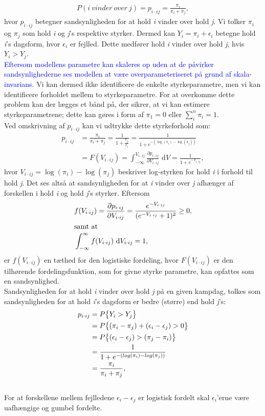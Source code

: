 \documentclass[11pt,a4paper]{article}
\begin{document}
\begin{align*}
    P(i\ vinder\ over\ j) = p_{i\cdot ij} = \frac{\pi_i}{\pi_i+\pi_j},
\end{align*}
hvor $p_{i\cdot ij}$ betegner sandsynligheden for at hold \textit{i} vinder over hold \textit{j}. Vi tolker $\pi_i$ og $\pi_j$ som hold \textit{i} og \textit{j}'s respektive styrker. Dermed kan $Y_i=\pi_i+\epsilon_i$ betegne hold \textit{i}'s dagsform, hvor $\epsilon_i$ er fejlled. Dette medfører hold \textit{i} vinder over hold \textit{j}, hvis $Y_i>Y_j$.\\ \textcolor{blue}{Eftersom modellens parametre kan skaleres op uden at de påvirker sandsynlighederne ses modellen at være overparameteriseret på grund af skala-invarians.} Vi kan dermed ikke identificere de enkelte styrkeparametre, men vi kan identificere forholdet mellem to styrkeparametre. For at overkomme dette problem kan der lægges et bånd på, der sikrer, at vi kan estimere styrkeparametrene; dette kan gøres i form af $\pi_1 = 0$ eller $\sum_i^n \pi_i = 1$. \\
Ved omskrivning af $p_{i\cdot ij}$ kan vi udtrykke dette styrkeforhold som:
\begin{align*}
    p_{i\cdot ij} &= \frac{\pi_i}{\pi_i+\pi_j}=\frac{1}{1+\frac{\pi_j}{\pi_i}}=\frac{1}{1+e^{-(\log(\pi_i)-\log(\pi_j))}}\\
    &=F(V_{i\cdot ij})=\int_{-\infty}^{V_{i\cdot ij}} \frac{\partial p_{i\cdot ij}}{\partial V_{i\cdot ij}} \text{ d}V=\frac{1}{1+e^{-V_{i\cdot ij}}},
\end{align*}
hvor $V_{i\cdot ij}=\log(\pi_i)-\log(\pi_j)$ beskriver log-styrken for hold \textit{i} i forhold til hold \textit{j}. Det ses altså at sandsynligheden for at \textit{i} vinder over \textit{j} afhænger af forskellen i hold \textit{i} og hold \textit{j}'s styrker. Eftersom 
\begin{align*}
&f(V_{i\cdot ij})=\frac{\partial p_{i\cdot ij}}{\partial V_{i\cdot ij}} = \frac{e^{-V_{i\cdot ij}}}{(e^{-V_{i\cdot ij}}+1)^2} \geq 0, \\ \intertext{samt at}
&\int_{-\infty}^\infty f(V_{i\cdot ij}) \text{  d} V_{i\cdot ij} = 1,
\end{align*}
er $f(V_{i\cdot ij})$ en tæthed for den logistiske fordeling, hvor $F(V_{i\cdot ij})$ er den tilhørende fordelingsfunktion, som for givne styrke parametre, kan opfattes som en sandsynlighed.\\
Sandsynligheden for at hold \textit{i} vinder over hold \textit{j} på en given kampdag, tolkes som sandsynligheden for at hold \textit{i}'s dagsform er bedre (større) end hold \textit{j}'s:
\begin{align*}
p_{i\cdot ij}&=P\big{\{}Y_i>Y_j\big{\}}
\\&=P\big{\{}(\pi_i-\pi_j)+(\epsilon_i-\epsilon_j)>0\big{\}}
\\&=P\big{\{}(\epsilon_i-\epsilon_j)>(\pi_j-\pi_i)\big{\}}
\\&=\frac{1}{1+e^{-(log(\pi_i)-log(\pi_j))}} 
\\&=\frac{\pi_i}{\pi_i+\pi_j},\;\;
\end{align*}
\\
For at forskellene mellem fejlledene $\epsilon_i-\epsilon_j$ er logistisk fordelt skal $\epsilon_i$'erne være uafhængige og gumbel fordelte.
\end{document}
